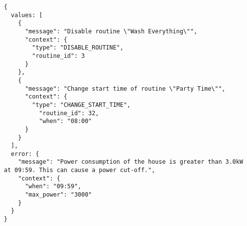 \begin{lstlisting}[language=numbered,caption={Response to HTTP POST request to the \texttt{/simulate} endpoint},label=code:api_response_simulate,float,floatplacement=H]
{
  values: [
    {
      "message": "Disable routine \"Wash Everything\"",
      "context": {
        "type": "DISABLE_ROUTINE",
        "routine_id": 3
      }
    },
    {
      "message": "Change start time of routine \"Party Time\"",
      "context": {
        "type": "CHANGE_START_TIME",
          "routine_id": 32,
          "when": "08:00"
      }
    }
  ],
  error: {
    "message": "Power consumption of the house is greater than 3.0kW at 09:59. This can cause a power cut-off.",
    "context": {
      "when": "09:59",
      "max_power": "3000"
    }
  }
}
\end{lstlisting}